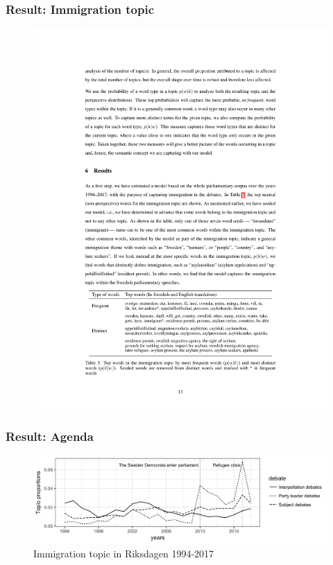 \documentclass[compress]{beamer}
\begin{document}
\begin{frame}
\frametitle{Result: Immigration topic}

\begin{figure}
    \centering
    \includegraphics[width=1\textwidth]{magnusson/immigration_topics}
\end{figure}

\end{frame}


\begin{frame}
\frametitle{Result: Agenda}

\begin{figure}
    \centering
    \includegraphics[width=1\textwidth]{magnusson/year_debate_topic_prop_tp.png}
    \caption{Immigration topic in Riksdagen 1994-2017}
\end{figure}

\end{frame}
\end{document}
